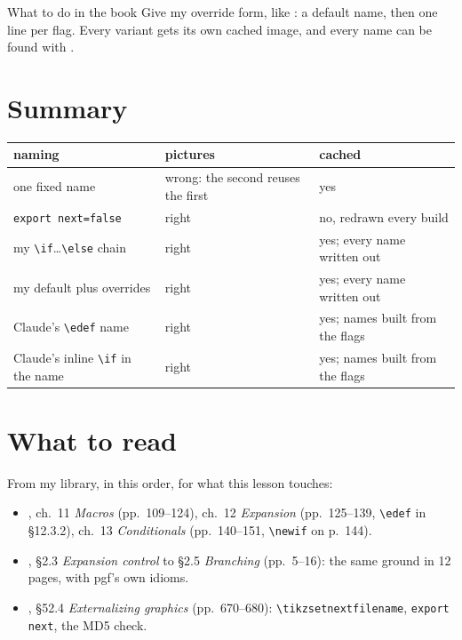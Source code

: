 \documentclass[11pt,a4paper]{article}
\let\sectionalone\section
\renewcommand{\section}{\needspace{8\baselineskip}\sectionalone}
\newcommand{\cs}[1]{\texttt{\textbackslash #1}}
\begin{document}
\begin{result}{What to do in the book}
Give  my override form, like : a default name, then one line per flag. Every variant gets its own cached image, and every name can be found with .
\end{result}

\section*{Summary}

\begin{center}\small
\begin{tabular}{@{}lll@{}}
  \toprule
  naming & pictures & cached \\
  \midrule
  one fixed name & wrong: the second reuses the first & yes \\
  \texttt{export next=false} & right & no, redrawn every build \\
  my \cs{if}…\cs{else} chain & right & yes; every name written out \\
  my default plus overrides & right & yes; every name written out \\
  Claude's \cs{edef} name & right & yes; names built from the flags \\
  Claude's inline \cs{if} in the name & right & yes; names built from the flags \\
  \bottomrule
\end{tabular}
\end{center}

\section*{What to read}

From my library, in this order, for what this lesson touches:
\begin{itemize}[leftmargin=1.2em,itemsep=0pt]
  \item \cite{tbt}, ch.~11 \textit{Macros} (pp.~109--124), ch.~12 \textit{Expansion} (pp.~125--139, \cs{edef} in §12.3.2), ch.~13 \textit{Conditionals} (pp.~140--151, \cs{newif} on p.~144).
  \item \cite{feuersanger}, §2.3 \textit{Expansion control} to §2.5 \textit{Branching} (pp.~5--16): the same ground in 12 pages, with pgf's own idioms.
  \item \cite{tikz}, §52.4 \textit{Externalizing graphics} (pp.~670--680): \cs{tikzsetnextfilename}, \texttt{export next}, the MD5 check.
\end{itemize}
\end{document}

